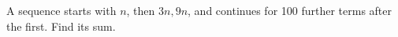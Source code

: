 A sequence starts with $n$, then $3n,9n$, and continues for 100 further terms after the first. Find its sum.

